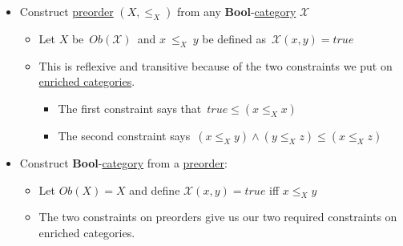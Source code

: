 \begin{itemize}
    \item Construct \hyperref[D1.30]{preorder} $(X,\leq_X)$ from any \textbf{Bool}-\hyperref[D2.46]{category} $\mathcal{X}$
          \begin{itemize}
            \item Let $X$ be \,$Ob(\mathcal{X})$\, and $x\ \leq_X\ y$ be defined as \,$\mathcal{X}(x,y)=true$\,
            \item This is reflexive and transitive because of the two constraints we put on \hyperref[D2.46]{enriched categories}.
                  \begin{itemize}
                    \item The first constraint says that \,$true \leq (x \leq_X x)$\,
                    \item The second constraint says \,$(x \leq_X y) \land (y \leq_X z) \leq (x \leq_X z)$\,
                  \end{itemize}
          \end{itemize}
    \item Construct \textbf{Bool}-\hyperref[D2.46]{category} from a \hyperref[D1.30]{preorder}: \,
          \begin{itemize}
            \item Let $Ob(X)=X$ and define $\mathcal{X}(x,y)=true$ iff $x \leq_X y$
            \item The two constraints on preorders give us our two required constraints on enriched categories.
          \end{itemize}\,
  \end{itemize}

